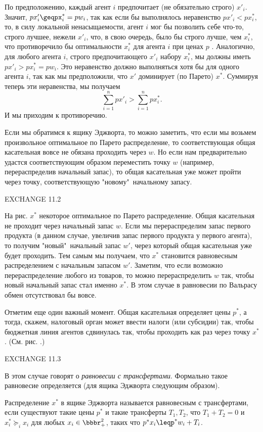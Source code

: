 По предположению, каждый агент $i$ предпочитает (не обязательно строго) $x'_i$.
Значит, $px'_i\geqpx^*_i= pw_i$, так как если бы выполнялось неравенство
$px'_i<px^*_i$, то, в силу локальной ненасыщаемости, агент $i$ мог бы
позволить себе что-то, строго лучшее, нежели $x'_i$, что, в свою
очередь, было бы строго лучше, чем $x^*_i$, что противоречило бы
оптимальности $x^*_i$ для агента $i$ при ценах $p$ .
Аналогично, для любого агента $i$, строго предпочитающего $x'_i$ набору
$x^*_i$, мы должны иметь $px'_i>px^*_i=pw_i$. Это неравенство должно
выполняться хотя бы для одного агента $i$, так как мы предположили, что
$x'$ доминирует (по Парето) $x^*$. Суммируя теперь эти неравенства, мы получаем
$$ \sum^n_{i=1}px'_i>\sum^n_{i=1}px^*_i.$$
И мы приходим к противоречию.

Если мы обратимся к ящику Эджворта, то можно заметить, что если мы возьмем
произвольное оптимальное по Парето распределение, то соответствующая
общая касательная вовсе не обязана проходить через $w$. Но если нам предварительно
удастся соответствующим образом переместить точку $w$ (например, перераспределив
начальный запас), то общая касательная
уже может пройти через точку, соответствующую "новому"\, начальному запасу.

EXCHANGE 11.2

На рис.   $x^*$ некоторое оптимальное по Парето распределение. Общая касательная
не проходит через начальный запас $w$. Если мы перераспределим запас первого продукта
(в данном случае, увеличив запас первого продукта у первого агента), то получим "новый"\,
начальный запас $w'$, через который общая касательная уже будет проходить. Тем самым
мы получаем, что $x^*$ становится равновесным распределением с начальным запасом $w'$.
Заметим, что если возможно перераспределение любого из товаров, то можно перераспределить
$w$ так, чтобы новый начальный запас стал именно $x^*$. В этом случае в равновесии
по Вальрасу обмен отсутствовал бы вовсе.

Отметим еще один важный момент. Общая касательная определяет
цены $p^*$, а тогда, скажем, налоговый орган может ввести налоги (или субсидии)
так, чтобы бюджетная линия агентов сдвинулась так, чтобы проходить как раз
через точку $x^*$. (См. рис.    .)

EXCHANGE 11.3

В этом случае говорят о \emph{равновесии с трансфертами}. Формально такое равновесие
определяется (для ящика Эджворта следующим образом).

Распределение $x^*$ в ящике Эджворта называется равновесным с
трансфертами, если существуют такие цены $p^*$ и такие трансферты
$T_1, T_2$, что $T_1+T_2=0$ и $x^*_i\succeq_ix_i$ для любых
$x_i\in\bbbr^2_+$, таких что $p^*x_i\leqp^*w_i+T_i$.

